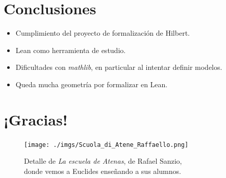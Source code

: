 \documentclass[t, aspectratio=169]{beamer}
\begin{document}
\section{Conclusiones}

\begin{frame}[fragile, c]
	\begin{itemize}[<+->]
		\item Cumplimiento del proyecto de formalización de Hilbert.
		\item Lean como herramienta de estudio.
		\item Dificultades con \textit{mathlib}, en particular al intentar
		      definir modelos.
		\item Queda mucha geometría por formalizar en Lean.
	\end{itemize}
\end{frame}

\section{¡Gracias!}

\begin{frame}[c]
	\vspace{7px}
	\begin{figure}
		\texttt{[image: ./imgs/Scuola\_di\_Atene\_Raffaello.png]}
		\caption*{\scriptsize
			Detalle de \textit{La escuela de Atenas}, de Rafael Sanzio, \\
			donde vemos a Euclides enseñando a sus alumnos.
		}
	\end{figure}
\end{frame}
\end{document}
